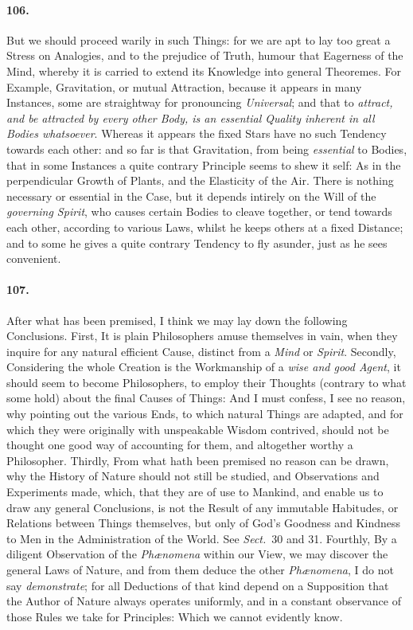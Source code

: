 \documentclass[]{article}
\newenvironment{sectionbody}{}{}
\begin{document}
\begin{sectionbody}
\paragraph{106.} But we should proceed warily in such Things: for we are apt to
lay too great a Stress on Analogies, and to the prejudice of
Truth, humour that Eagerness of the Mind, whereby it is carried
to extend its Knowledge into general Theoremes.  For Example,
Gravitation, or mutual Attraction, because it appears in many
Instances, some are straightway for pronouncing
\emph{Universal}; and that to \emph{attract, and be attracted by
every other Body, is an essential Quality inherent in all Bodies
whatsoever}.  Whereas it appears the fixed Stars have no such
Tendency towards each other: and so far is that Gravitation, from
being \emph{essential} to Bodies, that in some Instances a
quite contrary Principle seems to shew it self: As in the
perpendicular Growth of Plants, and the Elasticity of the Air.
There is nothing necessary or essential in the Case, but it
depends intirely on the Will of the \emph{governing Spirit},
who causes certain Bodies to cleave together, or tend towards
each other, according to various Laws, whilst he keeps others at
a fixed Distance; and to some he gives a quite contrary Tendency
to fly asunder, just as he sees convenient.



\paragraph{107.} After what has been premised, I think we may lay down the
following Conclusions.  First, It is plain Philosophers amuse
themselves in vain, when they inquire for any natural efficient
Cause, distinct from a \emph{Mind} or \emph{Spirit}.
Secondly, Considering the whole Creation is the Workmanship of a
\emph{wise and good Agent}, it should seem to become
Philosophers, to employ their Thoughts (contrary to what some
hold) about the final Causes of Things: And I must confess, I see
no reason, why pointing out the various Ends, to which natural
Things are adapted, and for which they were originally with
unspeakable Wisdom contrived, should not be thought one good way
of accounting for them, and altogether worthy a Philosopher.
Thirdly, From what hath been premised no reason can be drawn, why
the History of Nature should not still be studied, and
Observations and Experiments made, which, that they are of use to
Mankind, and enable us to draw any general Conclusions, is not
the Result of any immutable Habitudes, or Relations between
Things themselves, but only of {\sc God}'s Goodness and Kindness to Men
in the Administration of the World.  See
\emph{Sect.}\ 30 and 31.
Fourthly, By a diligent Observation of the
\emph{Ph{\ae}nomena} within our View, we may discover the
general Laws of Nature, and from them deduce the other
\emph{Ph{\ae}nomena}, I do not say \emph{demonstrate}; for
all Deductions of that kind depend on a Supposition that the
Author of Nature always operates uniformly, and in a constant
observance of those Rules we take for Principles: Which we cannot
evidently know.




\end{sectionbody}
\end{document}
